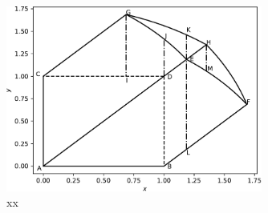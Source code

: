 \documentclass{article}
\theoremstyle{theorem}
\theoremstyle{definition}
\begin{document}
\begin{figure}[htb]
\centering
\includegraphics[width=0.75\textwidth]{sphere_xy.pdf}
\caption{xx}
\label{fig:sphere_xy}
\end{figure}




\end{document}
